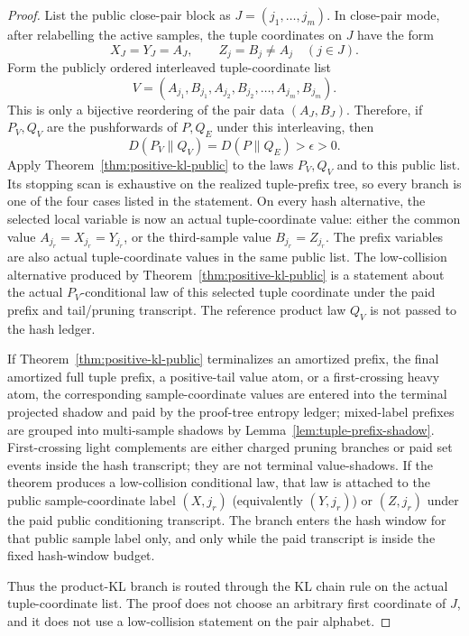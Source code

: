\documentclass[11pt]{article}
\begin{document}
\begin{proof}
List the public close-pair block as $J=(j_1,\ldots,j_m)$.  In close-pair mode,
after relabelling the active samples, the tuple coordinates on $J$ have the
form
\[
  X_J=Y_J=A_J,\qquad Z_j=B_j\ne A_j\quad(j\in J).
\]
Form the publicly ordered interleaved tuple-coordinate list
\[
  V=(A_{j_1},B_{j_1},A_{j_2},B_{j_2},\ldots,A_{j_m},B_{j_m}).
\]
This is only a bijective reordering of the pair data $(A_J,B_J)$.  Therefore,
if $P_V,Q_V$ are the pushforwards of $P,Q_E$ under this interleaving, then
\[
  D(P_V\|Q_V)=D(P\|Q_E)>\epsilon>0.
\]
Apply Theorem~\ref{thm:positive-kl-public} to the laws $P_V,Q_V$ and to this
public list.  Its stopping scan is exhaustive on the realized tuple-prefix
tree, so every branch is one of the four cases listed in the statement.  On
every hash alternative, the selected local variable is now an actual
tuple-coordinate value: either the common value
$A_{j_r}=X_{j_r}=Y_{j_r}$, or the third-sample value
$B_{j_r}=Z_{j_r}$.  The prefix variables are also actual tuple-coordinate
values in the same public list.  The low-collision alternative produced by
Theorem~\ref{thm:positive-kl-public} is a statement about the actual
$P_V$-conditional law of this selected tuple coordinate under the paid prefix
and tail/pruning transcript.  The reference product law $Q_V$ is not passed to
the hash ledger.

If Theorem~\ref{thm:positive-kl-public} terminalizes an amortized prefix, the
final amortized full tuple prefix, a positive-tail value atom, or a
first-crossing heavy atom, the corresponding sample-coordinate values are
entered into the terminal projected shadow and paid by the proof-tree entropy
ledger; mixed-label prefixes are grouped into multi-sample shadows by
Lemma~\ref{lem:tuple-prefix-shadow}.  First-crossing light complements are
either charged pruning branches or paid set events inside the hash transcript;
they are not terminal value-shadows.  If the theorem produces a low-collision
conditional law, that law is attached to the public sample-coordinate label
$(X,j_r)$ (equivalently $(Y,j_r)$) or $(Z,j_r)$ under the paid public
conditioning transcript.  The branch enters the hash window for that public
sample label only, and only while the paid transcript is inside the fixed
hash-window budget.

Thus the product-KL branch is routed through the KL chain rule on the actual
tuple-coordinate list.  The proof does not choose an arbitrary first
coordinate of $J$, and it does not use a low-collision statement on the pair
alphabet.
\end{proof}
\end{document}
